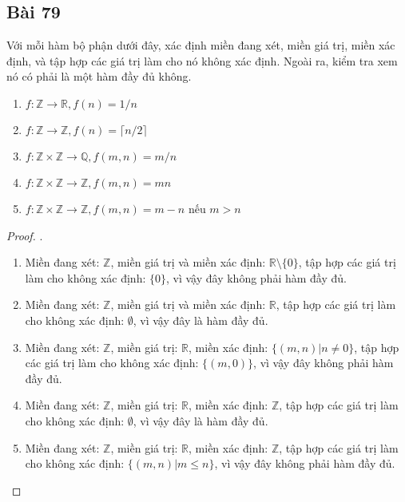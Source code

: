 \subsection*{Bài 79}
Với mỗi hàm bộ phận dưới đây, xác định miền đang xét, miền giá trị, miền xác định, và tập hợp các giá trị làm cho nó không xác định. Ngoài ra, kiểm tra xem nó có phải là một hàm đầy đủ không.
\begin{enumerate}[label=\alph*)]
    \item $f:\mathbb{Z}\to\mathbb{R},f(n)=1/n$
    \item $f:\mathbb{Z}\to\mathbb{Z},f(n)=\lceil n/2\rceil$
    \item $f:\mathbb{Z}\times\mathbb{Z}\to\mathbb{Q},f(m,n)=m/n$
    \item $f:\mathbb{Z}\times\mathbb{Z}\to\mathbb{Z},f(m,n)=mn$
    \item $f:\mathbb{Z}\times\mathbb{Z}\to\mathbb{Z},f(m,n)=m-n$ nếu $m>n$
\end{enumerate}
\begin{proof}.
    \begin{enumerate}[label=\alph*)]
        \item Miền đang xét: $\mathbb{Z}$, miền giá trị và miền xác định: $\mathbb{R}\setminus\{0\}$, tập hợp các giá trị làm cho không xác định: $\{0\}$, vì vậy đây không phải hàm đầy đủ.
        \item Miền đang xét: $\mathbb{Z}$, miền giá trị và miền xác định: $\mathbb{R}$, tập hợp các giá trị làm cho không xác định: $\emptyset$, vì vậy đây là hàm đầy đủ.
        \item Miền đang xét: $\mathbb{Z}$, miền giá trị: $\mathbb{R}$, miền xác định: $\{(m,n)|n\neq 0\}$, tập hợp các giá trị làm cho không xác định: $\{(m,0)\}$, vì vậy đây không phải hàm đầy đủ.
        \item Miền đang xét: $\mathbb{Z}$, miền giá trị: $\mathbb{R}$, miền xác định: $\mathbb{Z}$, tập hợp các giá trị làm cho không xác định: $\emptyset$, vì vậy đây là hàm đầy đủ.
        \item Miền đang xét: $\mathbb{Z}$, miền giá trị: $\mathbb{R}$, miền xác định: $\mathbb{Z}$, tập hợp các giá trị làm cho không xác định: $\{(m,n)|m\leq n\}$, vì vậy đây không phải hàm đầy đủ.
    \end{enumerate}
\end{proof}